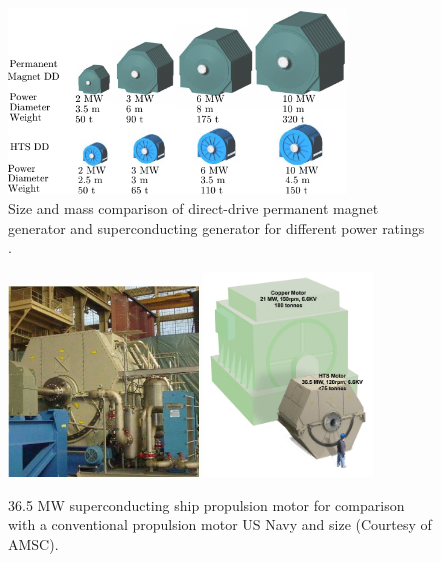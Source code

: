 \documentclass[a4paper, 11pt]{article} %
\begin{document}
\begin{figure}[t]
    \centering
    \includegraphics[width=0.8\textwidth]{amsc_ddpm_hts_comparison}
  	\caption{Size and mass comparison of direct-drive permanent magnet generator and superconducting generator for different power ratings \cite{amsc_presentation}.} 
  	\label{ddpm_hts_compare}
\end{figure}

\begin{figure}[t]
    \centering
    \includegraphics[width=0.45\textwidth]{36MW_AMSC}
    \includegraphics[width=0.4\textwidth]{amsc_36mw_compare}
    \caption{36.5 MW superconducting ship propulsion motor for comparison with a conventional propulsion motor US Navy and size  (Courtesy of AMSC).} 
    \label{amsc_36mw}
\end{figure}
\end{document}
